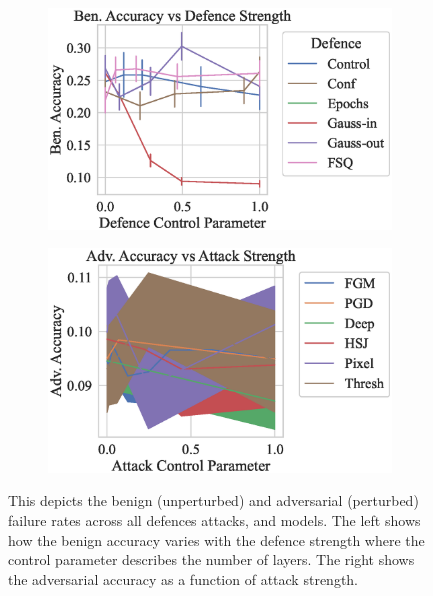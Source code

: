 \begin{figure}
    \centering
    \begin{subfigure}[]{0.45\textwidth}
        \centering
        \includegraphics[width=\textwidth]{cifar/def_param_vs_accuracy.eps}
    \end{subfigure}
    \begin{subfigure}[]{0.45\textwidth}
        \centering
        \includegraphics[width=\textwidth]{cifar/atk_param_vs_accuracy.eps}
    \end{subfigure}
    \caption{This depicts the benign (unperturbed) and adversarial (perturbed) failure rates across all defences attacks, and models. The left shows how the benign accuracy varies with the defence strength where the control parameter describes the number of layers. The right shows the adversarial accuracy as a function of attack strength.}
    \label{fig:cifar/strength}
\end{figure}


